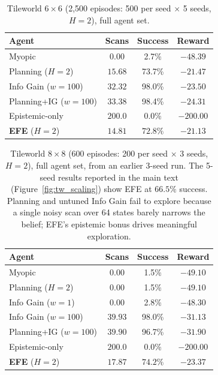 \documentclass{article}
\begin{document}
\begin{table}[h]
\centering
\caption{Tileworld $6{\times}6$ (2{,}500 episodes: 500 per seed $\times$ 5 seeds, $H{=}2$), full agent set.}
\begin{small}
\begin{tabular}{lccc}
\toprule
Agent & Scans & Success & Reward \\
\midrule
Myopic & $0.00$ & 2.7\% & $-48.39$ \\
Planning ($H{=}2$) & $15.68$ & 73.7\% & $-21.47$ \\
Info Gain ($w{=}100$) & $32.32$ & 98.0\% & $-23.50$ \\
Planning+IG ($w{=}100$) & $33.38$ & 98.4\% & $-24.31$ \\
Epistemic-only & $200.0$ & 0.0\% & $-200.00$ \\
\textbf{EFE} ($H{=}2$) & $\mathbf{14.81}$ & $\mathbf{72.8\%}$ & $\mathbf{-21.13}$ \\
\bottomrule
\end{tabular}
\end{small}
\end{table}

\begin{table}[h]
\centering
\caption{Tileworld $8{\times}8$ (600 episodes: 200 per seed $\times$ 3 seeds, $H{=}2$), full agent set, from an earlier 3-seed run. The 5-seed results reported in the main text (Figure~\ref{fig:tw_scaling}) show EFE at $66.5\%$ success. Planning and untuned Info Gain fail to explore because a single noisy scan over 64 states barely narrows the belief; EFE's epistemic bonus drives meaningful exploration.}
\begin{small}
\begin{tabular}{lccc}
\toprule
Agent & Scans & Success & Reward \\
\midrule
Myopic & $0.00$ & 1.5\% & $-49.10$ \\
Planning ($H{=}2$) & $0.00$ & 1.5\% & $-49.10$ \\
Info Gain ($w{=}1$) & $0.00$ & 2.8\% & $-48.30$ \\
Info Gain ($w{=}100$) & $39.93$ & 98.0\% & $-31.13$ \\
Planning+IG ($w{=}100$) & $39.90$ & 96.7\% & $-31.90$ \\
Epistemic-only & $200.0$ & 0.0\% & $-200.00$ \\
\textbf{EFE} ($H{=}2$) & $\mathbf{17.87}$ & $\mathbf{74.2\%}$ & $\mathbf{-23.37}$ \\
\bottomrule
\end{tabular}
\end{small}
\end{table}
\end{document}
